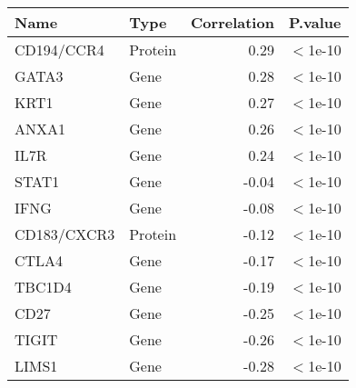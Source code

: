 \begin{tabular}{llrl}
  \hline
Name & Type & Correlation & P.value \\ 
  \hline
CD194/CCR4 & Protein & 0.29 & $<$1e-10 \\ 
  GATA3 & Gene & 0.28 & $<$1e-10 \\ 
  KRT1 & Gene & 0.27 & $<$1e-10 \\ 
  ANXA1 & Gene & 0.26 & $<$1e-10 \\ 
  IL7R & Gene & 0.24 & $<$1e-10 \\ 
  STAT1 & Gene & -0.04 & $<$1e-10 \\ 
  IFNG & Gene & -0.08 & $<$1e-10 \\ 
  CD183/CXCR3 & Protein & -0.12 & $<$1e-10 \\ 
  CTLA4 & Gene & -0.17 & $<$1e-10 \\ 
  TBC1D4 & Gene & -0.19 & $<$1e-10 \\ 
  CD27 & Gene & -0.25 & $<$1e-10 \\ 
  TIGIT & Gene & -0.26 & $<$1e-10 \\ 
  LIMS1 & Gene & -0.28 & $<$1e-10 \\ 
   \hline
\end{tabular}
